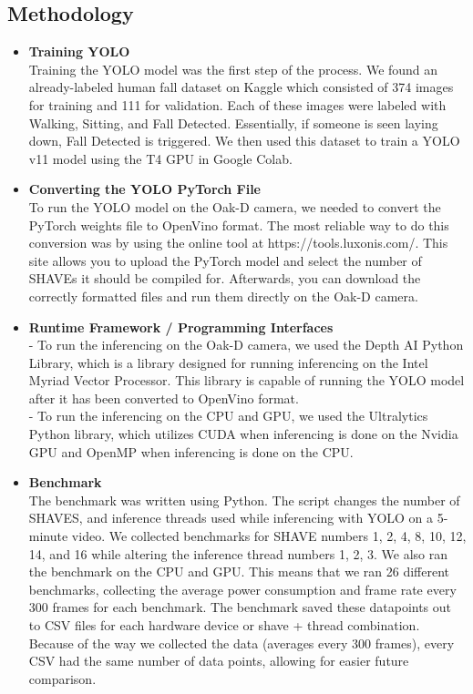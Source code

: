 \documentclass[sigconf,authorversion,nonacm]{acmart}
\begin{document}
\subsection{Methodology}  

\begin{itemize}
    \item \textbf{Training YOLO} \\ Training the YOLO model was the first step of the process. We found an already-labeled human fall dataset on Kaggle which consisted of 374 images for training and 111 for validation. Each of these images were labeled with Walking, Sitting, and Fall Detected. Essentially, if someone is seen laying down, Fall Detected is triggered. We then used this dataset to train a YOLO v11 model using the T4 GPU in Google Colab.
    \item \textbf{Converting the YOLO PyTorch File} \\ To run the YOLO model on the Oak-D camera, we needed to convert the PyTorch weights file to OpenVino format. The most reliable way to do this conversion was by using the online tool at https://tools.luxonis.com/. This site allows you to upload the PyTorch model and select the number of SHAVEs it should be compiled for. Afterwards, you can download the correctly formatted files and run them directly on the Oak-D camera. 
    \item \textbf{Runtime Framework / Programming Interfaces} \\ - To run the inferencing on the Oak-D camera, we used the Depth AI Python Library, which is a library designed for running inferencing on the Intel Myriad Vector Processor. This library is capable of running the YOLO model after it has been converted to OpenVino format. \\ - To run the inferencing on the CPU and GPU, we used the Ultralytics Python library, which utilizes CUDA when inferencing is done on the Nvidia GPU and OpenMP when inferencing is done on the CPU.
    \item \textbf{Benchmark} \\ The benchmark was written using Python. The script changes the number of SHAVES, and inference threads used while inferencing with YOLO on a 5-minute video. We collected benchmarks for SHAVE numbers 1, 2, 4, 8, 10, 12, 14, and 16 while altering the inference thread numbers 1, 2, 3. We also ran the benchmark on the CPU and GPU. This means that we ran 26 different benchmarks, collecting the average power consumption and frame rate every 300 frames for each benchmark. The benchmark saved these datapoints out to CSV files for each hardware device or shave + thread combination. Because of the way we collected the data (averages every 300 frames), every CSV had the same number of data points, allowing for easier future comparison.
\end{itemize}
\end{document}
